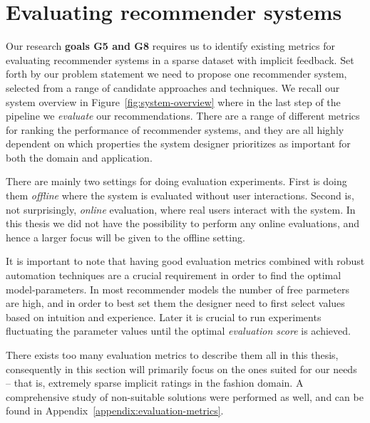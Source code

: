 \section{Evaluating recommender systems}
\label{sec:evaluation}

Our research \textbf{goals G5 and G8} requires us to identify existing metrics
for evaluating recommender systems in a sparse dataset with implicit feedback.
Set forth by our problem statement we need to propose one recommender system,
selected from a range of candidate approaches and techniques. We recall our
system overview in Figure~\ref{fig:system-overview} where in the last step of
the pipeline we \textit{evaluate} our recommendations. There are a range of
different metrics for ranking the performance of recommender systems, and they
are all highly dependent on which properties the system designer prioritizes as
important for both the domain and application.

There are mainly two settings for doing evaluation experiments. First is doing
them \textit{offline} where the system is evaluated without user interactions.
Second is, not surprisingly, \textit{online} evaluation, where real users
interact with the system. In this thesis we did not have the possibility to
perform any online evaluations, and hence a larger focus will be given to the
offline setting.

It is important to note that having good evaluation metrics combined with
robust automation techniques are a crucial requirement in order to find the
optimal model-parameters. In most recommender models the number of free
parmeters are high, and in order to best set them the designer need to first
select values based on intuition and experience. Later it is crucial to run
experiments fluctuating the parameter values until the optimal
\textit{evaluation score} is achieved.

There exists too many evaluation metrics to describe them all in this thesis,
consequently in this section will primarily focus on the ones suited for our
needs – that is, extremely sparse implicit ratings in the fashion domain. A
comprehensive study of non-suitable solutions were performed as well, and can
be found in Appendix~\ref{appendix:evaluation-metrics}.

